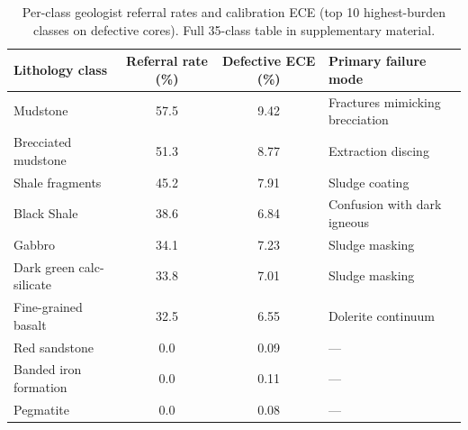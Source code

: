 \documentclass[5p,times,twocolumn]{elsarticle}
\begin{document}
\begin{table}[t]
  \centering
  \caption{Per-class geologist referral rates and calibration ECE (top 10 highest-burden
           classes on defective cores). Full 35-class table in supplementary material.}
  \label{tab:classreferral}
  \begin{tabular}{lccl}
    \toprule
    Lithology class & Referral rate (\%) & Defective ECE (\%) & Primary failure mode \\
    \midrule
    Mudstone               & 57.5 & 9.42 & Fractures mimicking brecciation \\
    Brecciated mudstone    & 51.3 & 8.77 & Extraction discing \\
    Shale fragments        & 45.2 & 7.91 & Sludge coating \\
    Black Shale            & 38.6 & 6.84 & Confusion with dark igneous \\
    Gabbro                 & 34.1 & 7.23 & Sludge masking \\
    Dark green calc-silicate & 33.8 & 7.01 & Sludge masking \\
    Fine-grained basalt    & 32.5 & 6.55 & Dolerite continuum \\
    Red sandstone          & 0.0  & 0.09 & --- \\
    Banded iron formation  & 0.0  & 0.11 & --- \\
    Pegmatite              & 0.0  & 0.08 & --- \\
    \bottomrule
  \end{tabular}
\end{table}



\end{document}
